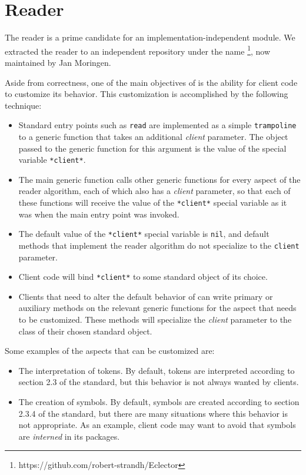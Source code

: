 \chapter{Reader}
\label{chap-reader}

The \commonlisp{} reader is a prime candidate for an
implementation-independent module.  We extracted the \sysname{} reader
to an independent repository under the name \eclector{}%
\footnote{https://github.com/robert-strandh/Eclector}, now maintained
by Jan Moringen.

Aside from correctness, one of the main objectives of \eclector{} is
the ability for client code to customize its behavior.  This
customization is accomplished by the following technique:

\begin{itemize}
\item Standard entry points such as \texttt{read} are implemented as a
  simple \texttt{trampoline} to a generic function that takes an
  additional \emph{client} parameter.  The object passed to the
  generic function for this argument is the value of the special
  variable \texttt{*client*}.
\item The main generic function calls other generic functions for
  every aspect of the reader algorithm, each of which also has a
  \emph{client} parameter, so that each of these functions will
  receive the value of the \texttt{*client*} special variable as it
  was when the main entry point was invoked.
\item The default value of the \texttt{*client*} special variable is
  \texttt{nil}, and default methods that implement the reader
  algorithm do not specialize to the \texttt{client} parameter.
\item Client code will bind \texttt{*client*} to some standard object
  of its choice.
\item Clients that need to alter the default behavior of \eclector{}
  can write primary or auxiliary methods on the relevant generic
  functions for the aspect that needs to be customized.  These methods
  will specialize the \emph{client} parameter to the class of their
  chosen standard object.
\end{itemize}

Some examples of the aspects that can be customized are:

\begin{itemize}
\item The interpretation of tokens.  By default, tokens are
  interpreted according to section 2.3 of the \commonlisp{} standard,
  but this behavior is not always wanted by clients.
\item The creation of symbols.  By default, symbols are created
  according to section 2.3.4 of the \commonlisp{} standard, but there
  are many situations where this behavior is not appropriate.  As an
  example, client code may want to avoid that symbols are
  \emph{interned} in its packages.
\end{itemize}

